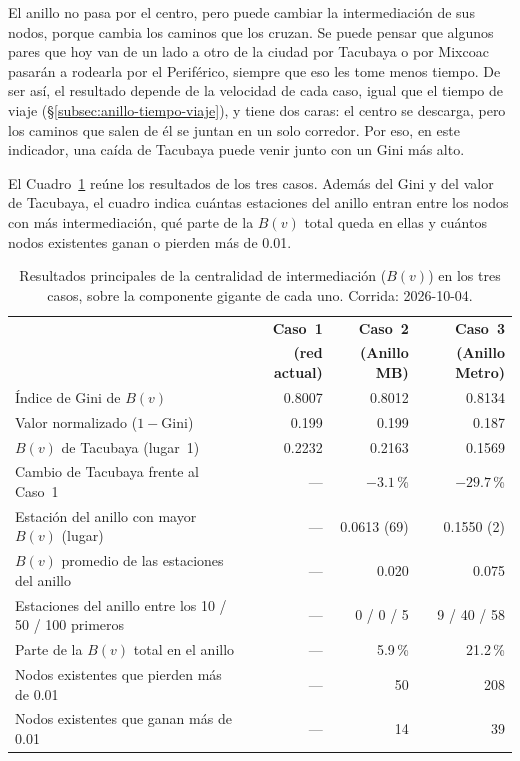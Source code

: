 El anillo no pasa por el centro, pero puede cambiar la intermediación de sus
nodos, porque cambia los caminos que los cruzan. Se puede pensar que algunos
pares que hoy van de un lado a otro de la ciudad por Tacubaya o por Mixcoac
pasarán a rodearla por el Periférico, siempre que eso les tome menos tiempo.
De ser así, el resultado depende de la velocidad de cada caso, igual que el
tiempo de viaje (§\ref{subsec:anillo-tiempo-viaje}), y tiene dos caras: el
centro se descarga, pero los caminos que salen de él se juntan en un solo
corredor. Por eso, en este indicador, una caída de Tacubaya puede venir junto
con un Gini más alto.

El Cuadro~\ref{tab:anillo-bv} reúne los resultados de los tres casos. Además del
Gini y del valor de Tacubaya, el cuadro indica cuántas estaciones del anillo
entran entre los nodos con más intermediación, qué parte de la $B(v)$ total
queda en ellas y cuántos nodos existentes ganan o pierden más de 0.01.

\begin{table}[H]
    \centering
    \caption[Intermediación en los tres casos]{%
    Resultados principales de la centralidad de intermediación ($B(v)$) en
    los tres casos, sobre la componente gigante de cada uno.
    Corrida: 2026-10-04.}
    \label{tab:anillo-bv}
    \small
    \begin{tabular}{|p{6.4cm}|r|r|r|}
        \hline
        & \textbf{Caso~1} & \textbf{Caso~2} & \textbf{Caso~3} \\
        & \textbf{(red actual)} & \textbf{(Anillo MB)} &
          \textbf{(Anillo Metro)} \\
        \hline
        Índice de Gini de $B(v)$                 & 0.8007 & 0.8012 & 0.8134 \\
        Valor normalizado ($1-\mathrm{Gini}$)    & 0.199  & 0.199  & 0.187 \\
        $B(v)$ de Tacubaya (lugar~1)             & 0.2232 & 0.2163 & 0.1569 \\
        Cambio de Tacubaya frente al Caso~1      & ---    & $-3.1$\,\% & $-29.7$\,\% \\
        \hline
        Estación del anillo con mayor $B(v)$ (lugar)
            & ---  & 0.0613 (69) & 0.1550 (2) \\
        $B(v)$ promedio de las estaciones del anillo
            & ---  & 0.020 & 0.075 \\
        Estaciones del anillo entre los 10 / 50 / 100 primeros
            & ---  & 0 / 0 / 5 & 9 / 40 / 58 \\
        Parte de la $B(v)$ total en el anillo    & ---    & 5.9\,\% & 21.2\,\% \\
        \hline
        Nodos existentes que pierden más de 0.01 & ---    & 50 & 208 \\
        Nodos existentes que ganan más de 0.01   & ---    & 14 & 39 \\
        \hline
    \end{tabular}
\end{table}

